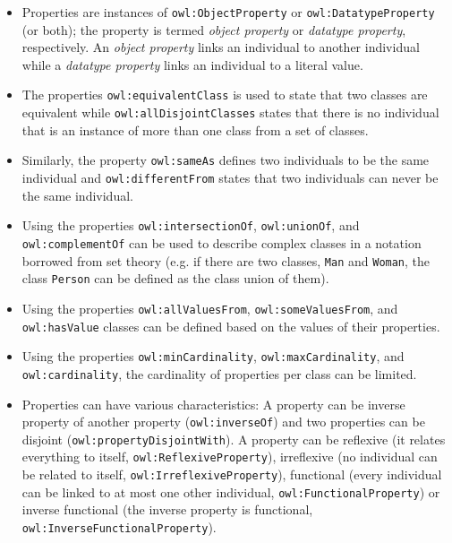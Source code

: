 \begin{itemize}
  \item Properties are instances of \texttt{owl:ObjectProperty} or \texttt{owl:DatatypeProperty} (or both); the property is termed \emph{object property} or \emph{datatype property}, respectively. An \emph{object property} links an individual to another individual while a \emph{datatype property} links an individual to a literal value.
  \item The properties \texttt{owl:equivalentClass} is used to state that two classes are equivalent while \texttt{owl:allDisjointClasses} states that there is no individual that is an instance of more than one class from a set of classes.
  \item Similarly, the property \texttt{owl:sameAs} defines two individuals to be the same individual and \texttt{owl:differentFrom} states that two individuals can never be the same individual.
  \item Using the properties \texttt{owl:intersectionOf}, \texttt{owl:unionOf}, and \texttt{owl:\hspace{0pt}complement\hspace{0pt}Of} can be used to describe complex classes in a notation borrowed from set theory (e.g. if there are two classes, \texttt{Man} and \texttt{Woman}, the class \texttt{Person} can be defined as the class union of them).
  \item Using the properties \texttt{owl:allValuesFrom}, \texttt{owl:someValuesFrom}, and \texttt{owl:\hspace{0pt}has\hspace{0pt}Value} classes can be defined based on the values of their properties.
  \item Using the properties \texttt{owl:minCardinality}, \texttt{owl:maxCardinality}, and \texttt{owl:\hspace{0pt}cardinality}, the cardinality of properties per class can be limited.
  \item Properties can have various characteristics: A property can be inverse property of another property (\texttt{owl:inverseOf}) and two properties can be disjoint (\texttt{owl:property\hspace{0pt}Disjoint\hspace{0pt}With}). A property can be reflexive (it relates everything to itself, \texttt{owl:\hspace{0pt}Reflexive\hspace{0pt}Property}), irreflexive (no individual can be related to itself, \texttt{owl:\hspace{0pt}Irreflexive\hspace{0pt}Property}), functional (every individual can be linked to at most one other individual, \texttt{owl:\hspace{0pt}Functional\hspace{0pt}Property}) or inverse functional (the inverse property is functional, \texttt{owl:\hspace{0pt}Inverse\hspace{0pt}Functional\hspace{0pt}Property}).
\end{itemize}

